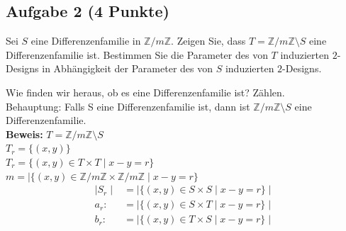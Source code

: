 \documentclass{article} %
\begin{document}
\subsection*{Aufgabe 2 (4 Punkte)}
Sei $S$ eine Differenzenfamilie in $\mathbb{Z}/m\mathbb{Z}$. Zeigen Sie, dass $T = \mathbb{Z}/m\mathbb{Z} \setminus S$ eine Differenzenfamilie ist. Bestimmen Sie die Parameter des von $T$ induzierten $2$-Designs in Abhängigkeit der Parameter des von $S$ induzierten $2$-Designs.
\begin{mybox}
Wie finden wir heraus, ob es eine Differenzenfamilie ist? Zählen. \\
Behauptung: Falls S eine Differenzenfamilie ist, dann ist $\mathbb{Z}/m\mathbb{Z} \setminus S$ eine Differenzenfamilie.  \\ \newline
\textbf{Beweis:} $T = \mathbb{Z}/m\mathbb{Z} \setminus S$ \\
$T_r = \{ (x,y)\}$ \\
$T_r = \{(x,y) \in T \times T \mid x-y = r\} $ \\
$ m = \mid \{(x,y) \in \mathbb{Z}/m\mathbb{Z} \times \mathbb{Z}/m\mathbb{Z} \mid x-y =r \}$ 
\begin{align*}
    \mid S_r\mid &= \mid \{ (x,y) \in S \times S \mid x-y = r \} \mid \\
    a_r: &= \mid \{ (x,y) \in S \times T \mid x-y = r \} \mid \\
    b_r: &= \mid \{ (x,y) \in T \times S \mid x-y = r \} \mid 
\end{align*}
\end{mybox}
\end{document}

